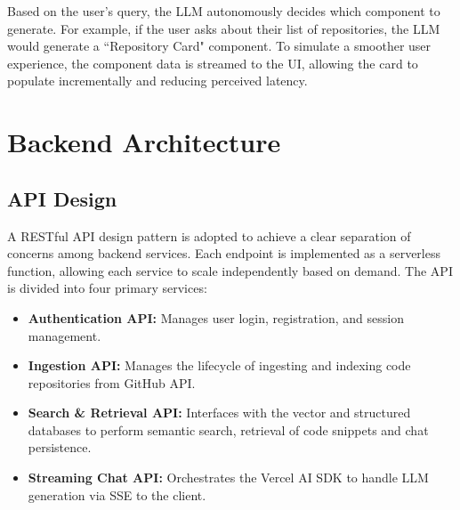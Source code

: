 Based on the user's query, the LLM autonomously decides which component to generate. For example, if the user asks about their list of repositories, the LLM would generate a ``Repository Card" component. To simulate a smoother user experience, the component data is streamed to the UI, allowing the card to populate incrementally and reducing perceived latency.

\section{Backend Architecture}
\subsection{API Design}
A RESTful API design pattern is adopted to achieve a clear separation of concerns among backend services. Each endpoint is implemented as a serverless function, allowing each service to scale independently based on demand. The API is divided into four primary services:
\begin{itemize}
    \item \textbf{Authentication API:} Manages user login, registration, and session management.
    \item \textbf{Ingestion API:} Manages the lifecycle of ingesting and indexing code repositories from GitHub API.
    \item \textbf{Search \& Retrieval API:} Interfaces with the vector and structured databases to perform semantic search, retrieval of code snippets and chat persistence.
    \item \textbf{Streaming Chat API:} Orchestrates the Vercel AI SDK to handle LLM generation via SSE to the client.
\end{itemize}

